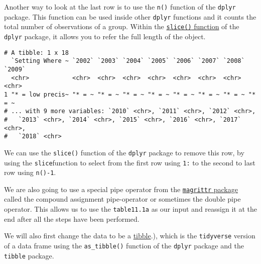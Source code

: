 \documentclass[
]{article}
\newenvironment{Shaded}{\begin{snugshade}}{\end{snugshade}}
\newcommand{\FloatTok}[1]{\textcolor[rgb]{0.00,0.00,0.81}{#1}}
\newcommand{\KeywordTok}[1]{\textcolor[rgb]{0.13,0.29,0.53}{\textbf{#1}}}
\newcommand{\NormalTok}[1]{#1}
\newcommand{\OperatorTok}[1]{\textcolor[rgb]{0.81,0.36,0.00}{\textbf{#1}}}
\newcommand{\StringTok}[1]{\textcolor[rgb]{0.31,0.60,0.02}{#1}}
\begin{document}
Another way to look at the last row is to use the \texttt{n()} function
of the \texttt{dplyr} package. This function can be used inside other
\texttt{dplyr} functions and it counts the total number of observations
of a group. Within the
\href{https://dplyr.tidyverse.org/reference/slice.html}{\texttt{slice()}
function} of the \texttt{dplyr} package, it allows you to refer the full
length of the object.

\begin{Shaded}
\end{Shaded}

\begin{verbatim}
# A tibble: 1 x 18
  `Setting Where ~ `2002` `2003` `2004` `2005` `2006` `2007` `2008` `2009`
  <chr>            <chr>  <chr>  <chr>  <chr>  <chr>  <chr>  <chr>  <chr> 
1 "* = low precis~ "* = ~ "* = ~ "* = ~ "* = ~ "* = ~ "* = ~ "* = ~ "* = ~
# ... with 9 more variables: `2010` <chr>, `2011` <chr>, `2012` <chr>,
#   `2013` <chr>, `2014` <chr>, `2015` <chr>, `2016` <chr>, `2017` <chr>,
#   `2018` <chr>
\end{verbatim}

We can use the \texttt{slice()} function of the \texttt{dplyr} package
to remove this row, by using the \texttt{slice}function to select from
the first row using \texttt{1:} to the second to last row using
\texttt{n()-1}.

We are also going to use a special pipe operator from the
\href{https://cran.r-project.org/web/packages/magrittr/vignettes/magrittr.html}{\texttt{magrittr}
package} called the compound assignment pipe-operator or sometimes the
double pipe operator. This allows us to use the \texttt{table11.1a} as
our input and reassign it at the end after all the steps have been
performed.

We will also first change the data to be a
\href{https://tibble.tidyverse.org/\#:~:text=A\%20tibble\%2C\%20or\%20tbl_df\%20\%2C\%20is,modern\%20reimagining\%20of\%20the\%20data.\&text=Tibbles\%20are\%20data.,a\%20variable\%20does\%20not\%20exist}{tibble}.),
which is the \texttt{tidyverse} version of a data frame using the
\texttt{as\_tibble()} function of the \texttt{dplyr} package and the
\texttt{tibble} package.
\end{document}

